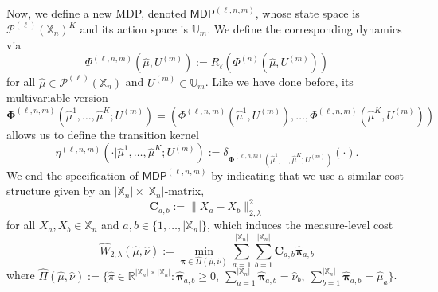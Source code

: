 \documentclass[11pt]{article}
\newcommand{\RR}{\mathbb{R}}
\newcommand{\XX}{\mathbb{X}}
\newcommand{\UU}{\mathbb{U}}
\newcommand{\cP}{\mathcal{P}}
\begin{document}
Now, we define a new MDP, denoted $\mathsf{MDP}^{(\ell,n,m)}$, whose state space is $\cP^{(\ell)}(\XX_n)^K$ and its action space is $\UU_m$. We define the corresponding dynamics via
\begin{equation}
    \Phi^{(\ell,n,m)}(\hat{\mu}, U^{(m)}) := R_\ell(\Phi^{(n)}(\hat{\mu}, U^{(m)}))
\end{equation}
for all $\hat{\mu}\in\cP^{(\ell)}(\XX_n)$ and $U^{(m)}\in\UU_m$. Like we have done before, its multivariable version
\begin{equation}
    \bm{\Phi}^{(\ell,n,m)}(\hat{\mu}^1,\ldots,\hat{\mu}^K; U^{(m)})= (\Phi^{(\ell,n,m)}(\hat{\mu}^1, U^{(m)}),\ldots,\Phi^{(\ell,n,m)}(\hat{\mu}^K, U^{(m)}))
\end{equation} 
allows us to define the transition kernel
\begin{equation}\label{eq:doubly-quantized-transition}
    \eta^{(\ell,n,m)}(\cdot | \hat{\mu}^1,\ldots,\hat{\mu}^K; U^{(m)}) := \delta_{\bm{\Phi}^{(\ell,n,m)}(\hat{\mu}^1,\ldots,\hat{\mu}^K; U^{(m)})}(\cdot).
\end{equation}
We end the specification of $\mathsf{MDP}^{(\ell,n,m)}$ by indicating that we use a similar cost structure given by an $|\XX_n|\times|\XX_n|$-matrix,
\begin{equation*}
    \mathbf{C}_{a,b} := \|X_a - X_b\|_{2,\lambda}^2
\end{equation*}
for all $X_a,X_b\in\XX_n$ and $a,b\in\{1,\ldots,|\XX_n|\}$, which induces the measure-level cost
\begin{equation*}
    \hat{W}_{2,\lambda}(\hat{\mu},\hat{\nu}) := \min_{\bm{\hat{\pi}}\in\hat{\Pi}(\hat{\mu},\hat{\nu})} \sum_{a=1}^{|\XX_n|}\sum_{b=1}^{|\XX_n|} \mathbf{C}_{a,b}\bm{\hat{\pi}}_{a,b}
\end{equation*}
where $\hat{\Pi}(\hat{\mu},\hat{\nu}) := \{\hat{\pi}\in\RR^{|\XX_n|\times|\XX_n|} : \bm{\hat{\pi}}_{a,b} \geq 0,\  \sum_{a=1}^{|\XX_n|}\bm{\hat{\pi}}_{a,b} = \hat{\nu}_b,\  \sum_{b=1}^{|\XX_n|}\bm{\hat{\pi}}_{a,b} = \hat{\mu}_a\}$.
\end{document}
